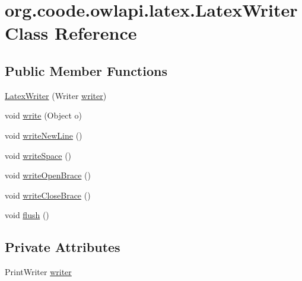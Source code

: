 \hypertarget{classorg_1_1coode_1_1owlapi_1_1latex_1_1_latex_writer}{\section{org.\-coode.\-owlapi.\-latex.\-Latex\-Writer Class Reference}
\label{classorg_1_1coode_1_1owlapi_1_1latex_1_1_latex_writer}
}
\subsection*{Public Member Functions}
\begin{DoxyCompactItemize}
\item 
\hyperlink{classorg_1_1coode_1_1owlapi_1_1latex_1_1_latex_writer_ad9dcb8da7113618eac9f89c0c8b1a05f}{Latex\-Writer} (Writer \hyperlink{classorg_1_1coode_1_1owlapi_1_1latex_1_1_latex_writer_a0964511bf488ab61195f568cec16de25}{writer})
\item 
void \hyperlink{classorg_1_1coode_1_1owlapi_1_1latex_1_1_latex_writer_a221d131e06fa258653cee9461837b5ea}{write} (Object o)
\item 
void \hyperlink{classorg_1_1coode_1_1owlapi_1_1latex_1_1_latex_writer_aee535c42b63c89f1b9124191bfff9867}{write\-New\-Line} ()
\item 
void \hyperlink{classorg_1_1coode_1_1owlapi_1_1latex_1_1_latex_writer_adb9545441b0a6cac55c4f8d5a2c79cec}{write\-Space} ()
\item 
void \hyperlink{classorg_1_1coode_1_1owlapi_1_1latex_1_1_latex_writer_ae84c2cb568916ed181f25268e8c5df8c}{write\-Open\-Brace} ()
\item 
void \hyperlink{classorg_1_1coode_1_1owlapi_1_1latex_1_1_latex_writer_a1cceedf4b9919293b9928b3ddbcd85df}{write\-Close\-Brace} ()
\item 
void \hyperlink{classorg_1_1coode_1_1owlapi_1_1latex_1_1_latex_writer_a64eac8dc32f343055b7ec4f09109cb21}{flush} ()
\end{DoxyCompactItemize}
\subsection*{Private Attributes}
\begin{DoxyCompactItemize}
\item 
Print\-Writer \hyperlink{classorg_1_1coode_1_1owlapi_1_1latex_1_1_latex_writer_a0964511bf488ab61195f568cec16de25}{writer}
\end{DoxyCompactItemize}


